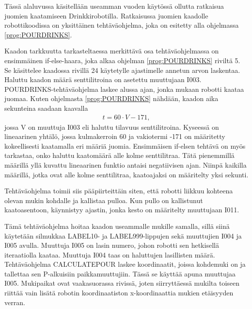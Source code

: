 Tässä alaluvussa käsitellään useamman vuoden käytössä ollutta ratkaisua juomien kaatamiseen Drinkkirobotilla. Ratkaisussa juomien kaadolle robottikoodissa on yksittäinen tehtäväohjelma, joka on esitetty alla ohjelmassa \ref{prog:POURDRINKS}.

\lstset{style=Yaskawatyyli}


Kaadon tarkkuutta tarkasteltaessa merkittävä osa tehtäväohjelmassa on ensimmäinen if-else-haara, joka alkaa ohjelman \ref{prog:POURDRINKS} riviltä 5. Se käsittelee kaadossa rivillä 24 käytetylle ajastimelle annetun arvon laskentaa. Haluttu kaadon määrä senttilitroina on asetettu muuttujaan I003. POURDRINKS-tehtäväohjelma laskee alussa ajan, jonka mukaan robotti kaataa juomaa. Kuten ohjelmasta \ref{prog:POURDRINKS} nähdään, kaadon aika sekunteina saadaan kaavalla
\begin{align}
   t = 60 \cdot V - 171 \mathrm{,}
\end{align}
jossa V on muuttuja I003 eli haluttu tilavuus senttilitroina. Kyseessä on lineaarinen yhtälö, jossa kulmakerroin 60 ja vakiotermi -171 on määritetty kokeellisesti kaatamalla eri määriä juomia. Ensimmäisen if-elsen tehtävä on myös tarkastaa, onko haluttu kaatomäärä alle kolme senttilitraa. Tätä pienemmillä määrillä yllä kuvattu lineaarinen funktio antaisi negatiivisen ajan. Niinpä kaikilla määrillä, jotka ovat alle kolme senttilitraa, kaatoajaksi on määritelty yksi sekunti.

Tehtäväohjelma toimii siis pääpiirteittäin siten, että robotti liikkuu kohteena olevan mukin kohdalle ja kallistaa pulloa. Kun pullo on kallistunut kaatoasentoon, käynnistyy ajastin, jonka kesto on määritelty muuttujaan I011.

Tämä tehtäväohjelma hoitaa kaadon useammalle mukille samalla, sillä siinä käytetään silmukkaa LABEL10- ja LABEL999-lippujen sekä muuttujien I004 ja I005 avulla. Muuttuja I005 on lasin numero, johon robotti sen hetkisellä iteraatiolla kaataa. Muuttuja I004 taas on haluttujen lasillisten määrä. Tehtäväohjelma CALCULATEPOUR laskee koordinaatit, joissa kohdemuki on ja tallettaa sen P-alkuisiin paikkamuuttujiin. Tässä se käyttää apuna muuttujaa I005. Mukipaikat ovat vaakasuorassa rivissä, joten siirryttäessä mukilta toiseen riittää vain lisätä robotin koordinaatiston x-koordinaattia mukien etäisyyden verran.
